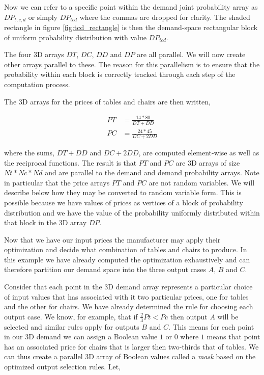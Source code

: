 Now we can refer to a specific point within the demand joint
probability array as $DP_{t,c,d}$ or simply $DP_{tcd}$ where the commas are dropped for
clarity. The shaded rectangle in figure \ref{fig:tcd_rectangle} is
then the demand-space rectangular block of uniform probability
distribution with value $DP_{tcd}$.

The four 3D arrays $DT$, $DC$, $DD$ and $DP$ are all parallel. We will
now create other arrays parallel to these. The reason for this
parallelism is to ensure that the probability within each block is
correctly tracked through each step of the computation process.

The 3D arrays for the prices of tables and chairs are then written,

\begin{align*}
PT &= \frac{14*80}{DT + DD}\\
PC &= \frac{24*45}{DC + 2 DD}
\end{align*}

where the sums, $DT+DD$ and $DC + 2DD$, are computed element-wise as
well as the reciprocal functions. The result is that $PT$ and $PC$ are
3D arrays of size $Nt*Nc*Nd$ and are parallel to the demand and demand
probability arrays. Note in particular that the price arrays $PT$ and
$PC$ are not random variables. We will describe below how they may be
converted to random variable form. This is possible because we have
values of prices as vertices of a block of probability distribution
and we have the value of the probability uniformly distributed within
that block in the 3D array $DP$.

Now that we have our input prices the manufacturer may apply their
optimization and decide what combination of tables and chairs to
produce. In this example we have already computed the optimization
exhaustively and can therefore partition our demand space into the
three output cases $A$, $B$ and $C$. 

Consider that each point in the 3D demand array represents a
particular choice of input values that has associated with it two
particular prices, one for tables and the other for chairs. We have
already determined the rule for choosing each output case. We know,
for example, that if $\frac{2}{3}Pt < Pc$ then output $A$ will be
selected and similar rules apply for outputs $B$ and $C$. This means
for each point in our 3D demand we can assign a Boolean value $1$ or
$0$ where $1$ means that point has an associated price for chairs that
is larger then two-thirds that of tables. We can thus create a
parallel 3D array of Boolean values called a \emph{mask} based on the
optimized output selection rules. Let,

